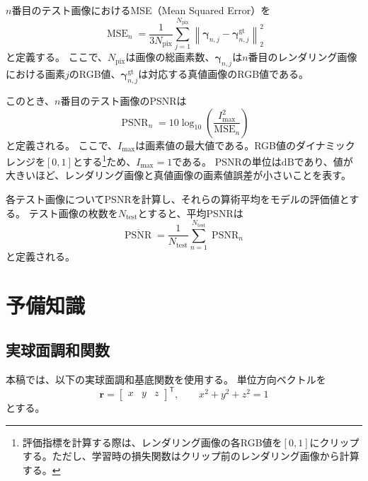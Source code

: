 \documentclass[dvipdfmx]{jlreq}
\begin{document}
$n$番目のテスト画像におけるMSE（Mean Squared Error）を
\begin{equation}
    \operatorname{MSE}_n = \frac{1}{3N_{\mathrm{pix}}} \sum_{j=1}^{N_{\mathrm{pix}}} \left\|\bm{\gamma}_{n,j} - \bm{\gamma}_{n,j}^{\mathrm{gt}}\right\|_2^2
    \label{eq:mse}
\end{equation}
と定義する。
ここで、$N_{\mathrm{pix}}$は画像の総画素数、$\bm{\gamma}_{n,j}$は$n$番目のレンダリング画像における画素$j$のRGB値、$\bm{\gamma}_{n,j}^{\mathrm{gt}}$は対応する真値画像のRGB値である。

このとき、$n$番目のテスト画像のPSNRは
\begin{equation}
    \operatorname{PSNR}_n = 10\log_{10} \left(\frac{I_{\max}^2}{\operatorname{MSE}_n}\right)
    \label{eq:psnr}
\end{equation}
と定義される。
ここで、$I_{\max}$は画素値の最大値である。RGB値のダイナミックレンジを$[0,1]$とする\footnote{評価指標を計算する際は、レンダリング画像の各RGB値を$[0,1]$にクリップする。ただし、学習時の損失関数はクリップ前のレンダリング画像から計算する。}ため、$I_{\max}=1$である。
PSNRの単位は$\mathrm{dB}$であり、値が大きいほど、レンダリング画像と真値画像の画素値誤差が小さいことを表す。

各テスト画像についてPSNRを計算し、それらの算術平均をモデルの評価値とする。
テスト画像の枚数を$N_{\mathrm{test}}$とすると、平均PSNRは
\begin{equation}
    \overline{\operatorname{PSNR}} = \frac{1}{N_{\mathrm{test}}} \sum_{n=1}^{N_{\mathrm{test}}} \operatorname{PSNR}_n
    \label{eq:mean_psnr}
\end{equation}
と定義される。



\appendix

\section{予備知識}
\label{sec:preliminaries}

\subsection{実球面調和関数}
\label{sec:real_spherical_harmonics}
本稿では、以下の実球面調和基底関数を使用する。
単位方向ベクトルを
\begin{equation}
    \bm{r}
    =
    \begin{bmatrix}
        x & y & z
    \end{bmatrix}^{\mathsf{T}},
    \qquad
    x^2+y^2+z^2=1
\end{equation}
とする。
\end{document}
